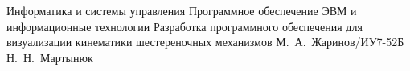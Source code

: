 \documentclass[a4paper,oneside,14pt]{extarticle}
\begin{document}
\makecourseworktitle
{Информатика и системы управления} %
{Программное обеспечение ЭВМ и информационные технологии} %
{Разработка программного обеспечения для визуализации кинематики шестереночных механизмов} %
{М.~А.~Жаринов/ИУ7-52Б} %
{Н.~Н.~Мартынюк} %
{} %


\setcounter{page}{4}



\renewcommand{\contentsname}{СОДЕРЖАНИЕ}
\tableofcontents









\end{document}
